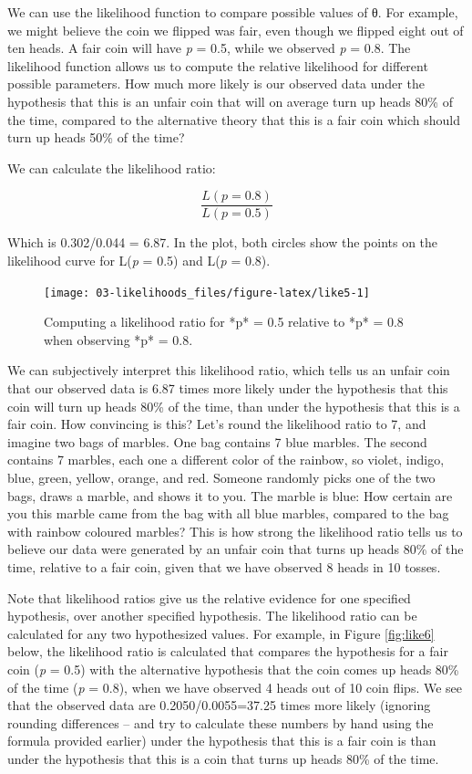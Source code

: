 \documentclass[
]{krantz}
\begin{document}
We can use the likelihood function to compare possible values of θ. For example, we might believe the coin we flipped was fair, even though we flipped eight out of ten heads. A fair coin will have \emph{p} = 0.5, while we observed \emph{p} = 0.8. The likelihood function allows us to compute the relative likelihood for different possible parameters. How much more likely is our observed data under the hypothesis that this is an unfair coin that will on average turn up heads 80\% of the time, compared to the alternative theory that this is a fair coin which should turn up heads 50\% of the time?

We can calculate the likelihood ratio:

\[
\frac{L(p = 0.8)}{L(p = 0.5)}
\]

Which is 0.302/0.044 = 6.87. In the plot, both circles show the points on
the likelihood curve for L(\emph{p} = 0.5) and L(\emph{p} = 0.8).

\begin{figure}

{\centering \texttt{[image: 03-likelihoods\_files/figure-latex/like5-1]} 

}

\caption{Computing a likelihood ratio for *p* = 0.5 relative to *p* = 0.8 when observing *p* = 0.8.}\label{fig:like5}
\end{figure}

We can subjectively interpret this likelihood ratio, which tells us an unfair coin that our observed data is 6.87 times more likely under the hypothesis that this coin will turn up heads 80\% of the time, than under the hypothesis that this is a fair coin. How convincing is this? Let's round the likelihood ratio to 7, and imagine two bags of marbles. One bag contains 7 blue marbles. The second contains 7 marbles, each one a different color of the rainbow, so violet, indigo, blue, green, yellow, orange, and red. Someone randomly picks one of the two bags, draws a marble, and shows it to you. The marble is blue: How certain are you this marble came from the bag with all blue marbles, compared to the bag with rainbow coloured marbles? This is how strong the likelihood ratio tells us to believe our data were generated by an unfair coin that turns up heads 80\% of the time, relative to a fair coin, given that we have observed 8 heads in 10 tosses.

Note that likelihood ratios give us the relative evidence for one specified hypothesis, over another specified hypothesis. The likelihood ratio can be calculated for any two hypothesized values. For example, in Figure \ref{fig:like6} below, the likelihood ratio is calculated that compares the hypothesis for a fair coin (\emph{p} = 0.5) with the alternative hypothesis that the coin comes up heads 80\% of the time (\emph{p} = 0.8), when we have observed 4 heads out of 10 coin flips. We see that the observed data are 0.2050/0.0055=37.25 times more likely (ignoring rounding differences -- and try to calculate these numbers by hand using the formula provided earlier) under the hypothesis that this is a fair coin is than under the hypothesis that this is a coin that turns up heads 80\% of the time.
\end{document}
